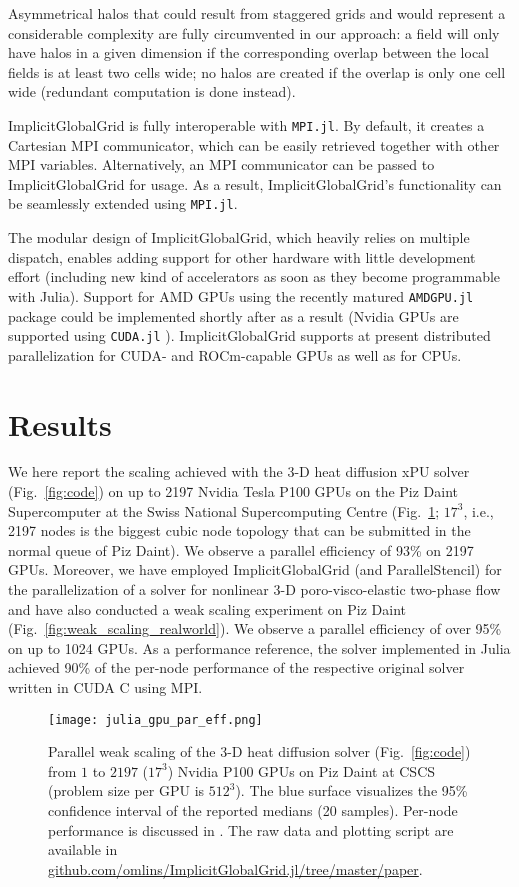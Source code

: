 \documentclass{juliacon}
\begin{document}
Asymmetrical halos that could result from staggered grids and would represent a considerable complexity are fully circumvented in our approach: a field will only have halos in a given dimension if the corresponding overlap between the local fields is at least two cells wide; no halos are created if the overlap is only one cell wide (redundant computation is done instead).

ImplicitGlobalGrid is fully interoperable with \texttt{MPI.jl}. By default, it creates a Cartesian MPI communicator, which can be easily retrieved together with other MPI variables. Alternatively, an MPI communicator can be passed to ImplicitGlobalGrid for usage. As a result, ImplicitGlobalGrid's functionality can be seamlessly extended using \texttt{MPI.jl}.

The modular design of ImplicitGlobalGrid, which heavily relies on multiple dispatch, enables adding support for other hardware with little development effort (including new kind of accelerators as soon as they become programmable with Julia). Support for AMD GPUs using the recently matured \texttt{AMDGPU.jl} package \cite{amdgpu_jl} could be implemented shortly after as a result (Nvidia GPUs are supported using \texttt{CUDA.jl} \cite{besard2018effective}). ImplicitGlobalGrid supports at present distributed parallelization for CUDA- and ROCm-capable GPUs as well as for CPUs.

\section{Results}
We here report the scaling achieved with the 3-D heat diffusion xPU solver (Fig.~\ref{fig:code}) on up to 2197 Nvidia Tesla P100 GPUs on the Piz Daint Supercomputer at the Swiss National Supercomputing Centre (Fig.~\ref{fig:weak_scaling}; $17^\mathrm{3}$, i.e., 2197 nodes is the biggest cubic node topology that can be submitted in the normal queue of Piz Daint). We observe a parallel efficiency of 93\% on 2197 GPUs.
Moreover, we have employed ImplicitGlobalGrid (and ParallelStencil) for the parallelization of a solver for nonlinear 3-D poro-visco-elastic two-phase flow and have also conducted a weak scaling experiment on Piz Daint (Fig.~\ref{fig:weak_scaling_realworld}). We observe a parallel efficiency of over 95\% on up to 1024 GPUs. As a performance reference, the solver implemented in Julia achieved 90\% of the per-node performance of the respective original solver written in CUDA C using MPI.

\begin{figure}[t]
    \centerline{\texttt{[image: julia\_gpu\_par\_eff.png]}}
    \caption{Parallel weak scaling of the 3-D heat diffusion solver (Fig.~\ref{fig:code}) from $1$ to $2197$ ($17^\mathrm{3}$) Nvidia P100 GPUs on Piz Daint at CSCS (problem size per GPU is $512^\mathrm{3}$). The blue surface visualizes the 95\% confidence interval of the reported medians (20 samples). Per-node performance is discussed in \cite{parallelstencil2024}. The raw data and plotting script are available in \url{github.com/omlins/ImplicitGlobalGrid.jl/tree/master/paper}.}
	\label{fig:weak_scaling}
\end{figure}
\end{document}
